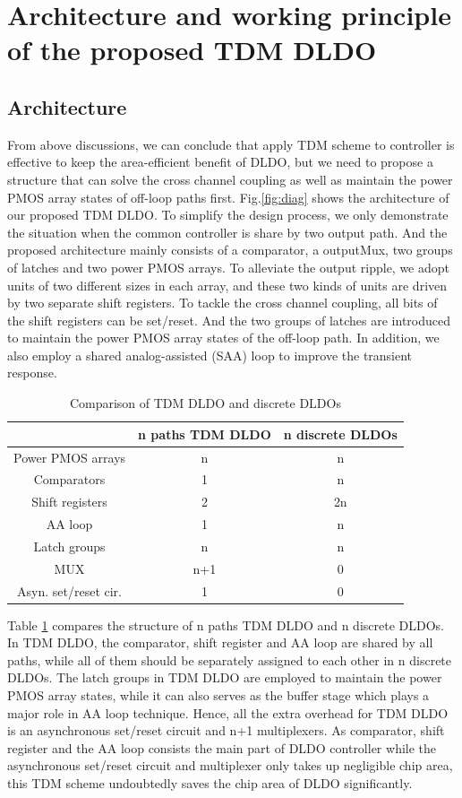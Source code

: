 \documentclass[journal]{IEEEtran}
\begin{document}
\section{Architecture and working principle of the proposed TDM DLDO}
\subsection{Architecture}
From above discussions, we can conclude that apply TDM scheme to controller is effective to keep the area-efficient benefit of DLDO, but we need to propose a structure that can solve the cross channel coupling as well as maintain the power PMOS array states of off-loop paths first. Fig.\ref{fig:diag} shows the architecture of our proposed TDM DLDO. To simplify the design process, we only demonstrate the situation when the common controller is share by two output path. And the proposed architecture mainly consists of a comparator, a outputMux, two groups of latches and two power PMOS arrays. To alleviate the output ripple, we adopt units of two different sizes in each array, and these two kinds of units are driven by two separate shift registers. To tackle the cross channel coupling, all bits of the shift registers can be set/reset. And the two groups of latches are introduced to maintain the power PMOS array states of the off-loop path. In addition, we also employ a shared analog-assisted (SAA) loop to improve the transient response.

\begin{table}[t!]
\centering
\caption{Comparison of TDM DLDO and discrete DLDOs}
\label{tab:compare}
\renewcommand{\arraystretch}{1.8}
\begin{tabular}{|c|c|c|}
\hline
 & n paths TDM DLDO & n discrete DLDOs \\ \hline
Power PMOS arrays & n & n\\\hline
Comparators & 1 & n \\\hline
Shift registers & 2 & 2n \\\hline
AA loop & 1 &n\\\hline
Latch groups & n & n\\\hline
MUX & n+1 & 0\\\hline
Asyn. set/reset cir. & 1 &0\\\hline
\end{tabular} 
\end{table}
Table \ref{tab:compare} compares the structure of n paths TDM DLDO and n discrete DLDOs. In TDM DLDO, the comparator, shift register and AA loop are shared by all paths, while all of them should be separately assigned to each other in n discrete DLDOs. The latch groups in TDM DLDO are employed to maintain the power PMOS array states, while it can also serves as the buffer stage which plays a major role in AA loop technique\cite{AALDO,AALDO1,NANDbasedAAloop}. Hence, all the extra overhead for TDM DLDO is an asynchronous set/reset circuit and n+1 multiplexers. As comparator, shift register and the AA loop consists the main part of DLDO controller while the asynchronous set/reset circuit and multiplexer only takes up negligible chip area, this TDM scheme undoubtedly saves the chip area of DLDO significantly.
\end{document}

